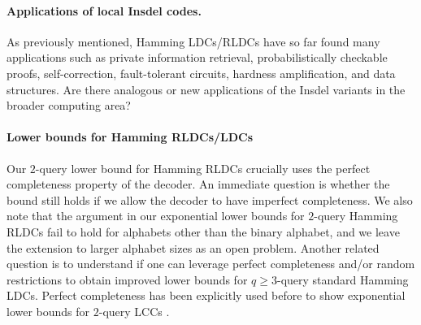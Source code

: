 




\paragraph{Applications of local Insdel codes.} As previously mentioned, Hamming LDCs/RLDCs have so far found many applications such as private information retrieval, probabilistically checkable proofs, self-correction,  fault-tolerant circuits,  hardness amplification, and data structures. Are there analogous or new applications of the Insdel variants in the broader computing area?

\paragraph{Lower bounds for Hamming RLDCs/LDCs} Our $2$-query lower bound for Hamming RLDCs crucially uses the perfect completeness property of the decoder. An immediate question is whether the bound still holds if we allow the decoder to have imperfect completeness. We also note that the argument in our exponential lower bounds for $2$-query Hamming RLDCs fail to hold for alphabets other than the binary alphabet, and we leave the extension to larger alphabet sizes as an open problem. 
Another related question is to understand if one can leverage perfect completeness and/or random restrictions to obtain improved lower bounds for $q\geq 3$-query standard Hamming LDCs. Perfect completeness has been explicitly used before to show exponential lower bounds for $2$-query LCCs \cite{bhattacharyya2017lower}.


